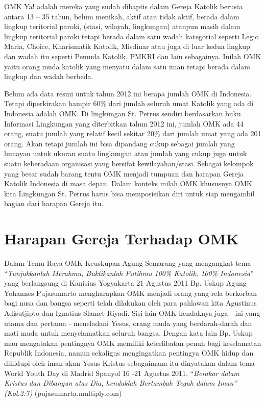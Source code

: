  
 
       OMK Ya! adalah mereka yang sudah dibaptis dalam Gereja Katolik berusia antara 13 – 35 tahun, belum menikah, aktif atau tidak aktif, berada dalam lingkup teritorial paroki, (stasi, wilayah, lingkungan) ataupun masih dalam lingkup teritorial paroki tetapi berada dalam satu wadah kategorial seperti Legio Maria, Choice, Kharismatik Katolik, Misdinar atau juga di luar kedua lingkup dan wadah itu seperti Pemuda Katolik, PMKRI dan lain sebagainya. Inilah OMK yaitu orang muda katolik yang menyatu dalam satu iman tetapi berada dalam lingkup dan wadah berbeda.
 
     Belum ada data resmi untuk tahun 2012 ini berapa jumlah OMK di Indonesia. Tetapi diperkirakan  hampir 60\% dari jumlah seluruh umat Katolik yang ada di Indonesia adalah OMK. Di lingkungan St. Petrus sendiri berdasarkan buku Informasi Lingkungan yang diterbitkan  tahun 2012 ini, jumlah OMK ada 44 orang, suatu jumlah yang relatif kecil sekitar 20\% dari jumlah umat yang ada 201 orang. Akan tetapi jumlah ini bisa  dipandang cukup sebagai jumlah yang lumayan untuk ukuran suatu lingkungan atau jumlah yang cukup juga untuk suatu keberadaan organisasi yang bersifat kewilayahan/stasi. Sebagai kelompok yang besar sudah barang tentu OMK menjadi tumpuan dan harapan Gereja Katolik Indonesia di masa depan. Dalam konteks inilah OMK khususnya OMK kita Lingkungan St. Petrus harus bisa memposisikan diri untuk siap mengambil bagian dari harapan Gereja itu.
 
\section*{Harapan Gereja Terhadap OMK}
 
      Dalam Temu Raya OMK Keuskupan Agung Semarang yang mengangkat tema “\textit{Tunjukkanlah Merahmu, Buktikanlah Putihmu 100\% Katolik, 100\% Indonesia}” yang berlangsung di Kanisius Yogyakarta 21 Agustus 2011 Bp. Uskup Agung Yohannes Pujasumarto  mengharapkan OMK menjadi orang yang rela berkorban bagi nusa dan bangsa seperti telah dilakukan oleh para pahlawan kita Agustinus Adisutjipto dan Ignatius Slamet Riyadi. Sisi lain OMK hendaknya juga - ini yang utama dan pertama - meneladani Yesus, orang muda yang berdarah-darah dan mati muda untuk menyelamatkan seluruh bangsa. Dengan kata lain Bp. Uskup mau mengatakan pentingnya OMK memiliki keterlibatan penuh bagi keselamatan Republik Indonesia, namun sekaligus mengingatkan pentingya OMK  hidup dan dihidupi oleh iman akan Yesus Kristus  sebagaimana itu dinyatakan dalam tema World Youth Day di Madrid Spanyol 16 -21 Agustus  2011. “\textit{Berakar dalam Kristus dan Dibangun atas Dia, hendaklah Bertambah Teguh dalam Iman” (Kol.2:7)} (pujasumarta.multiply.com)
     
